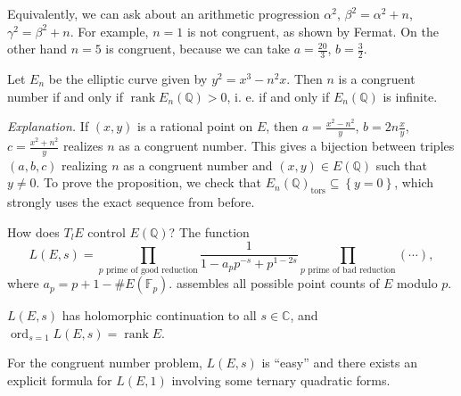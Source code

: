 \begin{enumerate}
  Equivalently, we can ask about an arithmetic progression \( \alpha^2 \), \( \beta^2 = \alpha^2 + n \), \( \gamma^2 = \beta^2 + n \).
  For example, \( n=1 \) is not congruent, as shown by Fermat.
  On the other hand \( n = 5 \) is congruent, because we can take \( a = \frac{20}{3} \), \( b = \frac{3}{2} \).
  \begin{proposition}
    Let \( E_n \) be the elliptic curve given by \( y^2 = x^3 - n^2 x \).
    Then \( n \) is a congruent number if and only if \( \operatorname{rank} E_n(\mathbb{Q}) > 0 \), i. e. if and only if \( E_n(\mathbb{Q}) \) is infinite.
  \end{proposition}
  \textit{Explanation.}
  If \( (x,y) \) is a rational point on \( E \), then \( a = \frac{x^2 - n^2}{y} \), \( b = 2n \frac{x}{y} \), \( c = \frac{x^2 + n^2}{y} \) realizes \( n \) as a congruent number.
  This gives a bijection between triples \( (a,b,c) \) realizing \( n \) as a congruent number and \( (x,y) \in E(\mathbb{Q}) \)  such that \( y \neq 0 \).
  To prove the proposition, we check that \( E_n(\mathbb{Q})_{\text{tors}} \subseteq \left\lbrace y = 0 \right\rbrace \), which strongly uses the exact sequence from before.

  How does \( T_lE \) control \( E(\mathbb{Q}) \)?
  The function
  \[ L(E,s) = \prod_{p\text{ prime of good reduction}} \frac{1}{1 - a_p p^{-s} + p^{1-2s}} \prod_{p\text{ prime of bad reduction}} \left( \cdots \right) , \] where \( a_p = p+1 - \# E(\mathbb{F}_p) \).
  assembles all possible point counts of \( E \) modulo \( p \).
  \begin{conjecture}
  \( L(E,s) \) has holomorphic continuation to all \( s \in \mathbb{C} \), and \( \operatorname{ord}_{s=1} L(E,s) = \operatorname{rank} E \).
  \end{conjecture}
  For the congruent number problem, \( L(E,s) \) is ``easy'' and there exists an explicit formula for \( L(E,1) \) involving some ternary quadratic forms.
\end{enumerate}


